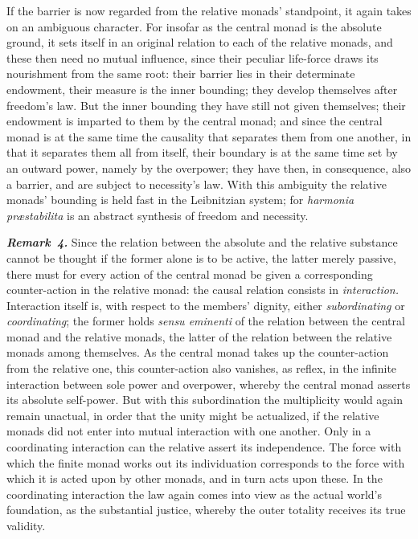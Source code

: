 \documentclass[12pt]{book}
\newcommand{\anm}[1]{\emph{\textbf{Remark~#1.}}}
\begin{document}
If the barrier is now regarded from the relative monads' standpoint, it
again takes on an ambiguous character. For insofar as the central monad is
the absolute ground, it sets itself in an original relation to each of the
relative monads, and these then need no mutual influence, since their
peculiar life-force draws its nourishment from the same root: their barrier
lies in their determinate endowment, their measure is the inner bounding;
they develop themselves after freedom's law. But the inner bounding they
have still not given themselves; their endowment is imparted to them by the
central monad; and since the central monad is at the same time the causality
that separates them from one another, in that it separates them all from
itself, their boundary is at the same time set by an outward power, namely
by the overpower; they have then, in consequence, also a barrier, and are
subject to necessity's law. With this ambiguity the relative monads'
bounding is held fast in the Leibnitzian system; for \textit{harmonia
præstabilita} is an abstract synthesis of freedom and necessity.

\anm{4} Since the relation between the absolute and the relative substance
cannot be thought if the former alone is to be active, the latter merely
passive, there must for every action of the central monad be given a
corresponding counter-action in the relative monad: the causal relation
consists in \emph{interaction.} Interaction itself is, with respect to the
members' dignity, either \emph{subordinating} or \emph{coordinating}; the
former holds \textit{sensu eminenti} of the relation between the central
monad and the relative monads, the latter of the relation between the
relative monads among themselves. As the central monad takes up the
counter-action from the relative one, this counter-action also vanishes, as
reflex, in the infinite interaction between sole power and overpower,
whereby the central monad asserts its absolute self-power. But with this
subordination the multiplicity would again remain unactual, in order that
the unity might be actualized, if the relative monads did not enter into
mutual interaction with one another. Only in a coordinating interaction can
the relative assert its independence. The force with which the finite monad
works out its individuation corresponds to the force with which it is acted
upon by other monads, and in turn acts upon these. In the coordinating
interaction the law again comes into view as the actual world's foundation,
as the substantial justice, whereby the outer totality receives its true
validity.
\end{document}
